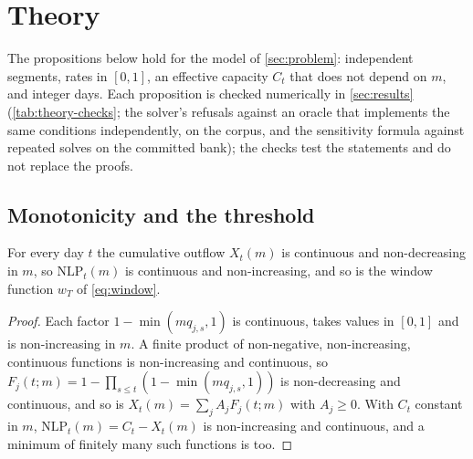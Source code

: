 \section{Theory}
\label{sec:theory}

The propositions below hold for the model of \cref{sec:problem}: independent segments, rates in $[0,1]$, an effective capacity $C_t$ that does not depend on $m$, and integer days. Each proposition is checked numerically in \cref{sec:results} (\cref{tab:theory-checks}; the solver's refusals against an oracle that implements the same conditions independently, on the corpus, and the sensitivity formula against repeated solves on the committed bank); the checks test the statements and do not replace the proofs.

\subsection{Monotonicity and the threshold}

\begin{proposition}
\label{prop:monotone}
For every day $t$ the cumulative outflow $X_t(m)$ is continuous and non-decreasing in $m$, so $\mathrm{NLP}_t(m)$ is continuous and non-increasing, and so is the window function $w_T$ of \cref{eq:window}.
\end{proposition}
\begin{proof}
Each factor $1-\min(m q_{j,s},1)$ is continuous, takes values in $[0,1]$ and is non-increasing in $m$. A finite product of non-negative, non-increasing, continuous functions is non-increasing and continuous, so $F_j(t;m)=1-\prod_{s\le t}(1-\min(mq_{j,s},1))$ is non-decreasing and continuous, and so is $X_t(m)=\sum_jA_jF_j(t;m)$ with $A_j\ge 0$. With $C_t$ constant in $m$, $\mathrm{NLP}_t(m)=C_t-X_t(m)$ is non-increasing and continuous, and a minimum of finitely many such functions is too.
\end{proof}

